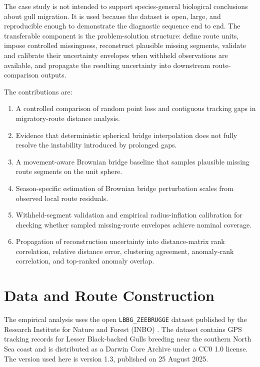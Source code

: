 The case study is not intended to support species-general biological conclusions about gull migration. It is used because the dataset is open, large, and reproducible enough to demonstrate the diagnostic sequence end to end. The transferable component is the problem-solution structure: define route units, impose controlled missingness, reconstruct plausible missing segments, validate and calibrate their uncertainty envelopes when withheld observations are available, and propagate the resulting uncertainty into downstream route-comparison outputs.

The contributions are:

\begin{enumerate}
\def\labelenumi{\arabic{enumi}.}
\tightlist
\item A controlled comparison of random point loss and contiguous tracking gaps in migratory-route distance analysis.
\item Evidence that deterministic spherical bridge interpolation does not fully resolve the instability introduced by prolonged gaps.
\item A movement-aware Brownian bridge baseline that samples plausible missing route segments on the unit sphere.
\item Season-specific estimation of Brownian bridge perturbation scales from observed local route residuals.
\item Withheld-segment validation and empirical radius-inflation calibration for checking whether sampled missing-route envelopes achieve nominal coverage.
\item Propagation of reconstruction uncertainty into distance-matrix rank correlation, relative distance error, clustering agreement, anomaly-rank correlation, and top-ranked anomaly overlap.
\end{enumerate}

\section{Data and Route Construction}\label{data-and-route-construction}

The empirical analysis uses the open \texttt{LBBG\_ZEEBRUGGE} dataset published by the Research Institute for Nature and Forest (INBO) \citep{stienen2025}. The dataset contains GPS tracking records for Lesser Black-backed Gulls breeding near the southern North Sea coast and is distributed as a Darwin Core Archive under a CC0 1.0 license. The version used here is version 1.3, published on 25 August 2025.


